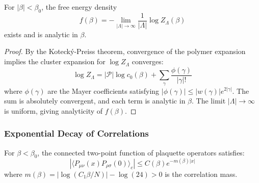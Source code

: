 \begin{theorem}
\label{thm:free_energy_analytic}
For $|\beta| < \beta_0$, the free energy density
\begin{equation}
f(\beta) = -\lim_{|\Lambda| \to \infty} \frac{1}{|\Lambda|} \log Z_\Lambda(\beta)
\end{equation}
exists and is analytic in $\beta$.
\end{theorem}

\begin{proof}
By the Kotecký-Preiss theorem, convergence of the polymer expansion implies the cluster expansion for $\log Z_\Lambda$ converges:
\begin{equation}
\log Z_\Lambda = |\mathcal{P}| \log c_0(\beta) + \sum_{\gamma} \frac{\phi(\gamma)}{|\gamma|!}
\end{equation}
where $\phi(\gamma)$ are the Mayer coefficients satisfying $|\phi(\gamma)| \leq |w(\gamma)| e^{2|\gamma|}$. The sum is absolutely convergent, and each term is analytic in $\beta$. The limit $|\Lambda| \to \infty$ is uniform, giving analyticity of $f(\beta)$.
\end{proof}

\subsubsection{Exponential Decay of Correlations}

\begin{theorem}
\label{thm:strong_coupling_decay}
For $\beta < \beta_0$, the connected two-point function of plaquette operators satisfies:
\begin{equation}
|\langle P_{\mu\nu}(x) P_{\rho\sigma}(0) \rangle_c| \leq C(\beta) e^{-m(\beta)|x|}
\end{equation}
where $m(\beta) = |\log(C_1\beta/N)| - \log(24) > 0$ is the correlation mass.
\end{theorem}

